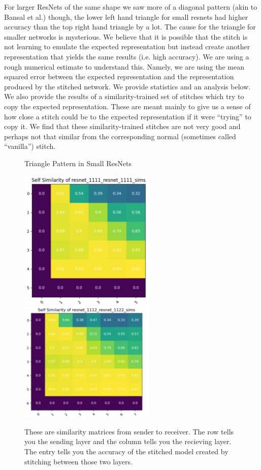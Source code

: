 \documentclass{article} %
\begin{document}
For larger ResNets of the same shape we saw more of a diagonal pattern (akin to Bansal et al.) though, the lower left hand triangle for small
resnets had higher
accuracy than the top right hand triangle by a lot. 
The cause for the triangle for smaller networks is mysterious. We believe that
it is possible that the stitch is not learning to emulate the expected representation but instead create another representation
that yields the same results (i.e. high accuracy). We are using a rough numerical estimate to understand this. Namely, we
are using the mean squared error between the expected representation and the representation produced by the stitched network.
We provide statistics and an analysis below. We also provide the results of a similarity-trained set of stitches which
try to copy the expected representation. These are meant mainly to give us a sense of how close a stitch could be to the
expected representation if it were ``trying'' to copy it. We find that these similarity-trained stitches are not very good
and perhaps not that similar from the corresponding normal (sometimes called ``vanilla'') stitch.

\begin{center}
   \begin{figure}[h!]
      \centering
      \caption{Triangle Pattern in Small ResNets}
      \includegraphics[width=6.5cm]{resnet1111_1111.png}
      \includegraphics[width=6.5cm]{resnet1112_1122.png}
      \caption*{These are similarity matrices from sender to receiver. The row tells you the sending layer and the column tells you the recieving layer.
      The entry tells you the accuracy of the stitched model created by stitching between those two layers.}
   \end{figure}
\end{center}
\end{document}

